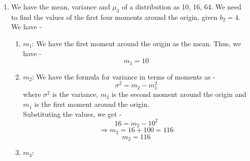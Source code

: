 \begin{enumerate}
    \begin{enumerate}
        \item $\mu_2$:
        \[\mu_2 = \frac{(a - \mu)^2 + (b - \mu)^2}{2}\]
        \[= \frac{\left(a - \frac{a + b}{2}\right)^2 + \left(b - \frac{a + b}{2}\right)^2}{2}\]
        \[= \frac{\left(\frac{a - b}{2}\right)^2 + \left(\frac{b - a}{2}\right)^2}{2} = \frac{\frac{(a - b)^2}{4} + \frac{(b - a)^2}{4}}{2} = \frac{\frac{(a - b)^2}{4} + \frac{(a - b)^2}{4}}{2} = \frac{\frac{2(a - b)^2}{4}}{2} = \frac{(a - b)^2}{4}\]
        \[\boxed{\mu_2 = \frac{(a - b)^2}{4}
        }\]
        \item $\mu_3$:
        \[\mu_3 = \frac{(a - \mu)^3 + (b - \mu)^3}{2}\]
        \[= \frac{\left(a - \frac{a + b}{2}\right)^3 + \left(b - \frac{a + b}{2}\right)^3}{2}\]
        \[= \frac{\left(\frac{a - b}{2}\right)^3 + \left(\frac{b - a}{2}\right)^3}{2} = \frac{\frac{(a - b)^3}{8} + \frac{(b - a)^3}{8}}{2} = \frac{\frac{(a - b)^3}{8} + \frac{-(a - b)^3}{8}}{2} = 0\]
        \[\boxed{\mu_3 = 0
        }\]
        \item $\mu_4$:
        \[\mu_4 = \frac{(a - \mu)^4 + (b - \mu)^4}{2}\]
        \[= \frac{\left(a - \frac{a + b}{2}\right)^4 + \left(b - \frac{a + b}{2}\right)^4}{2}\]
        \[= \frac{\left(\frac{a - b}{2}\right)^4 + \left(\frac{b - a}{2}\right)^4}{2} = \frac{\frac{(a - b)^4}{16} + \frac{(b - a)^4}{16}}{2} = \frac{\frac{(a - b)^4}{16} + \frac{(a - b)^4}{16}}{2} = \frac{\frac{2(a - b)^4}{16}}{2} = \frac{(a - b)^4}{16}\]
        \[\boxed{\mu_4 = \frac{(a - b)^4}{16}
        }\]
    \end{enumerate}
    \item We have the mean, variance and $\mu_3$ of a distribution as 10, 16, 64. We need to find the values of the first four moments around the origin, given $b_2 =4$. We have - 
    \begin{enumerate}
        \item $m_1$:
        We have the first moment around the origin as the mean. Thus, we have -
        \[\boxed{m_1 = 10
        }\]
        \item $m_2$:
        We have the formula for variance in terms of moments as -
        \[\sigma^2 = m_2 - m_1^2\]
        where $\sigma^2$ is the variance, $m_2$ is the second moment around the origin and $m_1$ is the first moment around the origin. \\
        Substituting the values, we get -
        \[16 = m_2 - 10^2\]
        \[\Rightarrow m_2 = 16 + 100 = 116\]
        \[\boxed{m_2 = 116
        }\]
        \item $m_3$:

\end{enumerate}
\end{enumerate}
